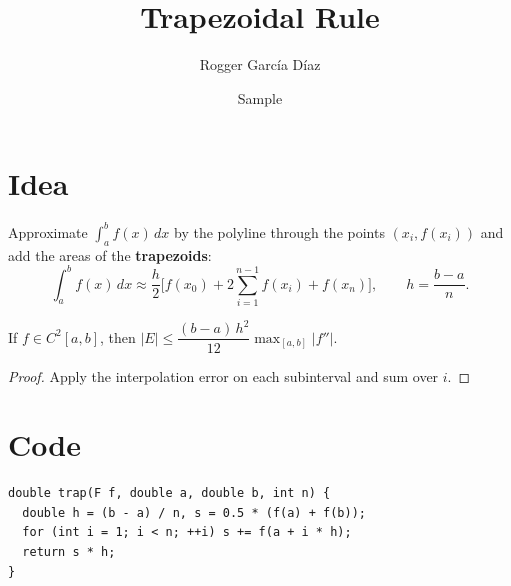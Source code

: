 \title{Trapezoidal Rule}
\author{Rogger García Díaz}
\date{Sample}

\maketitle
\section{Idea}
Approximate $\int_a^b f(x)\,dx$ by the polyline through the points $(x_i, f(x_i))$ and add the areas of the \textbf{trapezoids}:
\begin{equation}
\int_a^b f(x)\,dx \approx \frac{h}{2}\Big[f(x_0)+2\sum_{i=1}^{n-1}f(x_i)+f(x_n)\Big],\qquad h=\frac{b-a}{n}.
\end{equation}
\begin{theorem}
If $f\in C^2[a,b]$, then $|E|\le \dfrac{(b-a)\,h^2}{12}\max_{[a,b]}|f''|$.
\end{theorem}
\begin{proof}
Apply the interpolation error on each subinterval and sum over $i$.
\end{proof}
\section{Code}
\begin{verbatim}
double trap(F f, double a, double b, int n) {
  double h = (b - a) / n, s = 0.5 * (f(a) + f(b));
  for (int i = 1; i < n; ++i) s += f(a + i * h);
  return s * h;
}
\end{verbatim}

